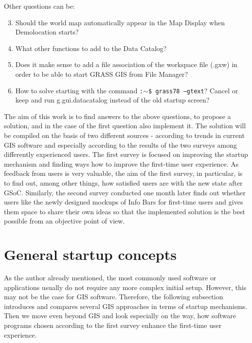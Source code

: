 \documentclass[a4paper,10pt,twoside]{article}
\begin{document}
\noindent Other questions can be:

\begin{enumerate}
\setcounter{enumi}{2}

 \item \noindent Should the world map automatically appear in the Map Display when Demolocation starts?
 
 \item \noindent What other functions to add to the Data Catalog?
 
 \item \noindent Does it make sense to add a file association of the workspace file (.gxw) in order to be able to start GRASS GIS from File Manager?
  
\item \noindent How to solve starting with the command \texttt{:$\sim$\$ grass78 --gtext}? Cancel or keep and run g.gui.datacatalog instead of the old startup screen?
 
\end{enumerate}

\noindent The aim of this work is to find answers to the above questions, to propose a solution, and in the case of the first question also implement it. The solution will be compiled on the basis of two different sources - according to trends in current GIS software and especially according to the results of the two surveys among differently experienced users. The first survey is focused on improving the startup mechanism and finding ways how to improve the first-time user experience. As feedback from users is very valuable, the aim of the first survey, in particular, is to find out, among other things, how satisfied users are with the new state after GSoC. Similarly, the second survey conducted one month later finds out whether users like the newly designed mockups of Info Bars for first-time users and gives them space to share their own ideas so that the implemented solution is the best possible from an objective point of view.

\newpage
\vspace*{-1cm}
\section{General startup concepts}
\label{sec:startup_concepts}
\noindent
\large
As the author already mentioned, the most commonly used software or applications usually do not require any more complex initial setup. However, this may not be the case for GIS software. Therefore, the following subsection introduces and compares several GIS approaches in terms of startup mechanisms. Then we move even beyond GIS and look especially on the way, how software programs chosen according to the first survey enhance the first-time user experience.
\end{document}
